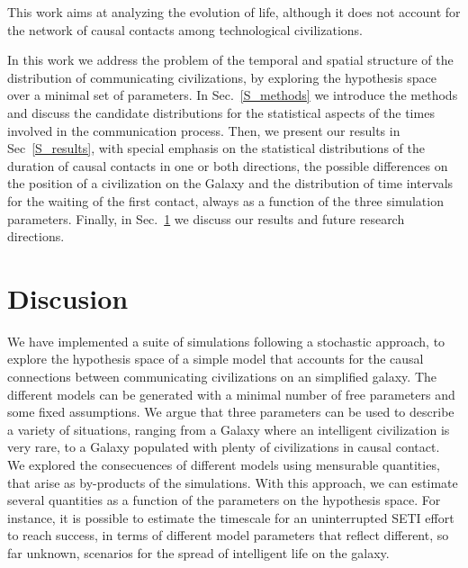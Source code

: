\documentclass[crop]{CSLB}
\begin{document}
This work aims at analyzing the evolution of life, although it does
not account for the network of causal contacts among technological
civilizations.


In this work we address the problem of the temporal and spatial
structure of the distribution of communicating civilizations, by
exploring the hypothesis space over a minimal set of parameters.
%
In Sec.~\ref{S_methods} we introduce the methods and discuss the
candidate distributions for the statistical aspects of the times
involved in the communication process.
%
Then, we present our results in Sec~\ref{S_results}, with special
emphasis on the statistical distributions of the duration of causal
contacts in one or both directions, the possible differences on the
position of a civilization on the Galaxy and the distribution of time
intervals for the waiting of the first contact, always as a function
of the three simulation parameters.
%
Finally, in Sec.~\ref{S_discussion} we discuss our results and future
research directions.





                      





\section{Discusion}\label{S_discussion}

We have implemented a suite of simulations following a stochastic
approach, to explore the hypothesis space of a simple model that
accounts for the causal connections between communicating
civilizations on an simplified galaxy.
%
The different models can be generated with a minimal number of free
parameters and some fixed assumptions.
%
We argue that three parameters can be used to describe a variety of
situations, ranging from a Galaxy where an intelligent civilization is
very rare, to a Galaxy populated with plenty of civilizations in
causal contact.
%
We explored the consecuences of different models using mensurable
quantities, that arise as by-products of the simulations.
%
With this approach, we can estimate several quantities as a function
of the parameters on the hypothesis space.
%
For instance, it is possible to estimate the timescale for an
uninterrupted SETI effort to reach success, in terms of different
model parameters that reflect different, so far unknown, scenarios for
the spread of intelligent life on the galaxy.
\end{document}
